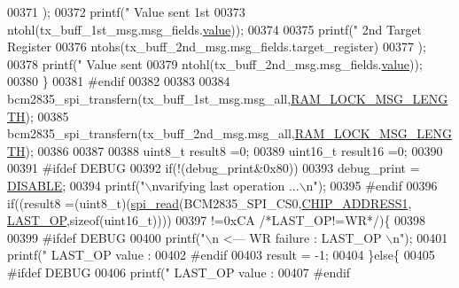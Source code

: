 \begin{DoxyCode}
{{00371        );
00372        printf(\textcolor{stringliteral}{"       Value sent 1st  %
00373        ntohl(tx\_buff\_1st\_msg.msg\_fields.\hyperlink{a00012_a638e4503e0ae6ce655b7ad2e17e8f0ad}{value}));
00374        
00375        printf(\textcolor{stringliteral}{"       2nd Target Register %
00376        ntohs(tx\_buff\_2nd\_msg.msg\_fields.target\_register)
00377        );
00378        printf(\textcolor{stringliteral}{"       Value sent  %
00379        ntohl(tx\_buff\_2nd\_msg.msg\_fields.\hyperlink{a00012_a638e4503e0ae6ce655b7ad2e17e8f0ad}{value}));
00380        \}
00381 \textcolor{preprocessor}{    #endif}
00382 \textcolor{preprocessor}{}
00383     
00384     bcm2835\_spi\_transfern(tx\_buff\_1st\_msg.msg\_all,\hyperlink{a00041_ab38a2f23d72262bab020eb973958f37b}{RAM\_LOCK\_MSG\_LENGTH});
00385     bcm2835\_spi\_transfern(tx\_buff\_2nd\_msg.msg\_all,\hyperlink{a00041_ab38a2f23d72262bab020eb973958f37b}{RAM\_LOCK\_MSG\_LENGTH});
00386 
00387     
00388     uint8\_t  result8  =0;
00389     uint16\_t result16 =0;
00390     
00391 \textcolor{preprocessor}{     #ifdef DEBUG }
00392 \textcolor{preprocessor}{}     \textcolor{keywordflow}{if}(!(debug\_print&0x80))
00393      debug\_print = \hyperlink{a00037_a99496f7308834e8b220f7894efa0b6ab}{DISABLE};
00394        printf(\textcolor{stringliteral}{"\(\backslash\)nvarifying last operation  ...\(\backslash\)n"});
00395 \textcolor{preprocessor}{     #endif}
00396 \textcolor{preprocessor}{}     \textcolor{keywordflow}{if}((result8 =(uint8\_t)(\hyperlink{a00007_ga7ad9f65ee46aca507374096506a0b1c4}{spi\_read}(BCM2835\_SPI\_CS0,\hyperlink{a00037_a94de2b046db6e10257ef4481c0a15eaa}{CHIP\_ADDRESS1},
      \hyperlink{a00036_aed1301248abf6c26045727a190f6550a}{LAST\_OP},\textcolor{keyword}{sizeof}(uint16\_t))))
00397      !=0xCA \textcolor{comment}{/*LAST\_OP!=WR*/})\{
00398              
00399 \textcolor{preprocessor}{     #ifdef DEBUG}
00400 \textcolor{preprocessor}{}       printf(\textcolor{stringliteral}{"\(\backslash\)n                                               <---  WR failure : LAST\_OP \(\backslash\)n"});
00401        printf(\textcolor{stringliteral}{"        LAST\_OP value  :%
00402 \textcolor{preprocessor}{     #endif}
00403 \textcolor{preprocessor}{}     result = -1;
00404      \}\textcolor{keywordflow}{else}\{
00405 \textcolor{preprocessor}{      #ifdef DEBUG}
00406 \textcolor{preprocessor}{}       printf(\textcolor{stringliteral}{"        LAST\_OP value  :%
00407 \textcolor{preprocessor}{     #endif}
}}}}}}}
\end{DoxyCode}
